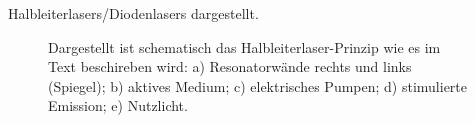 Halbleiterlasers/Diodenlasers dargestellt.
\begin{figure}[h]
	\centering
	\caption[Halbleiterlaser Prinzip]{Dargestellt ist schematisch das
	Halbleiterlaser-Prinzip wie es im Text beschireben wird: a)
	Resonatorwände rechts und links (Spiegel); b) aktives
	Medium; c) elektrisches Pumpen; d)
	stimulierte Emission; e) Nutzlicht.}\label{fig:halbleiterlaser-prinzip}
\end{figure}

